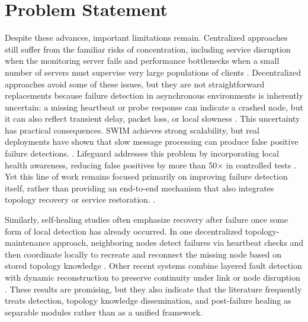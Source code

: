 \section{Problem Statement}
\label{sec:problem_statement}
Despite these advances, important limitations remain.
Centralized approaches still suffer from the familiar risks of concentration, including service disruption
when the monitoring server fails and performance bottlenecks when a small number of servers must supervise
very large populations of clients
\cite{guoDecentralizedMultiVenueRealTime2025}.
Decentralized approaches avoid some of these issues, but they are not straightforward replacements because failure
detection in asynchronous environments is inherently uncertain: a missing heartbeat or probe response can indicate a
crashed node, but it can also reflect transient delay, packet loss, or local slowness
\cite{nikolicSelfHealingDilemmasDistributed2021} \cite{dadgarLifeguardLocalHealth2018}.
This uncertainty has practical consequences. SWIM achieves strong scalability, but real deployments have shown that
slow message processing can produce false positive failure detections. \cite{dadgarLifeguardLocalHealth2018}.
Lifeguard addresses this problem by incorporating local health awareness, reducing false positives by more than 50× in
controlled tests \cite{dadgarLifeguardLocalHealth2018}.
Yet this line of work remains focused primarily on improving failure detection itself, rather than providing an
end-to-end mechanism that also integrates topology recovery or service restoration.
\cite{dasSWIMScalableWeaklyconsistent2002} \cite{dadgarLifeguardLocalHealth2018}.

Similarly, self-healing studies often emphasize recovery after failure once some form of local detection has already
occurred. In one decentralized topology-maintenance approach, neighboring nodes detect failures via heartbeat checks
and then coordinate locally to recreate and reconnect the missing node based on stored topology knowledge
\cite{rodriguezDecentralisedSelfHealingApproach2021}.
Other recent systems combine layered fault detection with dynamic reconstruction to preserve continuity under link or
node disruption \cite{guoDecentralizedMultiVenueRealTime2025}.
These results are promising, but they also indicate that the literature frequently treats detection, topology knowledge
dissemination, and post-failure healing as separable modules rather than as a unified framework.

